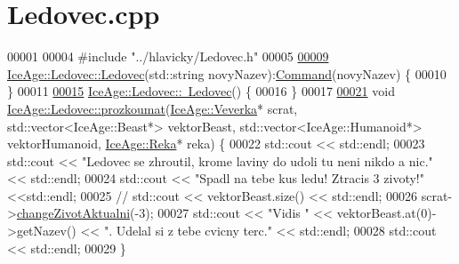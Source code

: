 \hypertarget{Ledovec_8cpp_source}{}\section{Ledovec.\+cpp}
\label{Ledovec_8cpp_source}

\begin{DoxyCode}
00001 
00004 \textcolor{preprocessor}{#include "../hlavicky/Ledovec.h"}
00005 
\hypertarget{Ledovec_8cpp_source.tex_l00009}{}\hyperlink{classIceAge_1_1Ledovec_adb1cb86de12b9d72888202bef00ae962}{00009} \hyperlink{classIceAge_1_1Ledovec_adb1cb86de12b9d72888202bef00ae962}{IceAge::Ledovec::Ledovec}(std::string novyNazev):\hyperlink{classIceAge_1_1Command}{Command}(novyNazev) \{
00010 \}
00011 
\hypertarget{Ledovec_8cpp_source.tex_l00015}{}\hyperlink{classIceAge_1_1Ledovec_a7533fa470c0ab65a05c03a0de2b1ba5e}{00015} \hyperlink{classIceAge_1_1Ledovec_a7533fa470c0ab65a05c03a0de2b1ba5e}{IceAge::Ledovec::~Ledovec}() \{
00016 \}
00017 
\hypertarget{Ledovec_8cpp_source.tex_l00021}{}\hyperlink{classIceAge_1_1Ledovec_a92538e91b889749c03de931e77da8753}{00021} \textcolor{keywordtype}{void} \hyperlink{classIceAge_1_1Ledovec_a92538e91b889749c03de931e77da8753}{IceAge::Ledovec::prozkoumat}(\hyperlink{classIceAge_1_1Veverka}{IceAge::Veverka}* scrat, 
      std::vector<IceAge::Beast*> vektorBeast, std::vector<IceAge::Humanoid*> vektorHumanoid, 
      \hyperlink{classIceAge_1_1Reka}{IceAge::Reka}* reka) \{
00022     std::cout << std::endl;
00023     std::cout << \textcolor{stringliteral}{"Ledovec se zhroutil, krome laviny do udoli tu neni nikdo a nic."} << std::endl;
00024     std::cout << \textcolor{stringliteral}{"Spadl na tebe kus ledu! Ztracis 3 zivoty!"} <<std::endl;
00025 \textcolor{comment}{//    std::cout << vektorBeast.size() << std::endl;}
00026     scrat->\hyperlink{classIceAge_1_1Zivot_a980dc5a5af6d14c23ecca025e3ec7485}{changeZivotAktualni}(-3);
00027     std::cout << \textcolor{stringliteral}{"Vidis "} << vektorBeast.at(0)->getNazev() << \textcolor{stringliteral}{". Udelal si z tebe cvicny terc."} << 
      std::endl; 
00028     std::cout << std::endl;
00029 \}
\end{DoxyCode}
